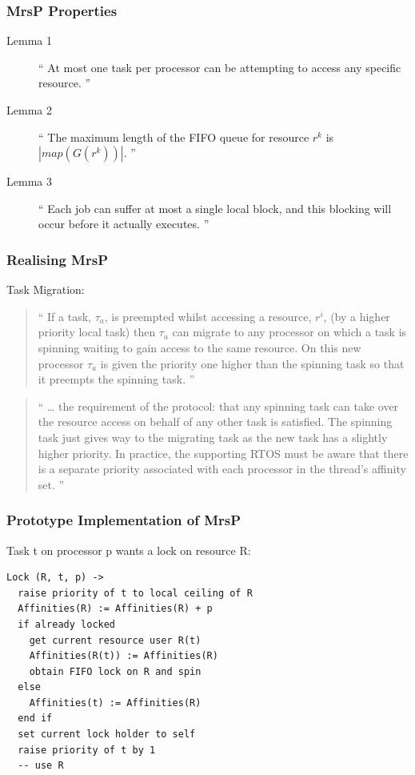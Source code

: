 \subsubsection{MrsP Properties}

\begin{description}
  \item [Lemma 1]
    ``
    At most one task per processor can be attempting
    to access any specific resource.
    ''
  \item [Lemma 2]
    ``
    The maximum length of the FIFO queue for resource $r^k$
    is $|map(G(r^k))|$.
    ''
  \item [Lemma 3]
    ``
    Each job can suffer at most a single local block,
    and this blocking will occur before it actually executes.
    ''
\end{description}

\subsubsection{Realising MrsP}

Task Migration:

\begin{quote}
``
If a task, $\tau_a$, is preempted whilst accessing a resource, $r^i$,
(by a higher priority local task)
then $\tau_a$ can migrate to any processor
on which a task is spinning
waiting to gain access to the same resource.
On this new processor $\tau_a$ is given the priority
one higher than the spinning task so that it preempts the spinning task.
''
\end{quote}

\begin{quote}
``
\dots
the requirement of the protocol:
that any spinning task can take over the resource access
on behalf of any other task is satisfied.
The spinning task just gives way to the migrating task
as the new task has a slightly higher priority.
In practice,
the supporting RTOS must be aware
that there is a separate priority associated
with each processor in the thread’s affinity set.
''
\end{quote}

\subsubsection{Prototype Implementation of MrsP}

Task t on processor p wants a lock on resource R:
\begin{verbatim}
Lock (R, t, p) ->
  raise priority of t to local ceiling of R
  Affinities(R) := Affinities(R) + p
  if already locked
    get current resource user R(t)
    Affinities(R(t)) := Affinities(R)
    obtain FIFO lock on R and spin
  else
    Affinities(t) := Affinities(R)
  end if
  set current lock holder to self
  raise priority of t by 1
  -- use R
\end{verbatim}

